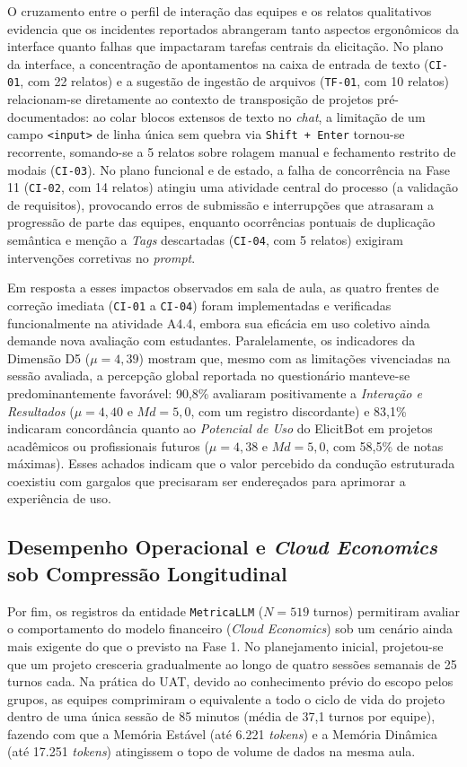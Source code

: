 O cruzamento entre o perfil de interação das equipes e os relatos qualitativos evidencia que os incidentes reportados abrangeram tanto aspectos ergonômicos da interface quanto falhas que impactaram tarefas centrais da elicitação. No plano da interface, a concentração de apontamentos na caixa de entrada de texto (\texttt{CI-01}, com 22 relatos) e a sugestão de ingestão de arquivos (\texttt{TF-01}, com 10 relatos) relacionam-se diretamente ao contexto de transposição de projetos pré-documentados: ao colar blocos extensos de texto no \textit{chat}, a limitação de um campo \texttt{<input>} de linha única sem quebra via \texttt{Shift + Enter} tornou-se recorrente, somando-se a 5 relatos sobre rolagem manual e fechamento restrito de modais (\texttt{CI-03}). No plano funcional e de estado, a falha de concorrência na Fase 11 (\texttt{CI-02}, com 14 relatos) atingiu uma atividade central do processo (a validação de requisitos), provocando erros de submissão e interrupções que atrasaram a progressão de parte das equipes, enquanto ocorrências pontuais de duplicação semântica e menção a \textit{Tags} descartadas (\texttt{CI-04}, com 5 relatos) exigiram intervenções corretivas no \textit{prompt}.

Em resposta a esses impactos observados em sala de aula, as quatro frentes de correção imediata (\texttt{CI-01} a \texttt{CI-04}) foram implementadas e verificadas funcionalmente na atividade A4.4, embora sua eficácia em uso coletivo ainda demande nova avaliação com estudantes. Paralelamente, os indicadores da Dimensão D5 ($\mu = 4,39$) mostram que, mesmo com as limitações vivenciadas na sessão avaliada, a percepção global reportada no questionário manteve-se predominantemente favorável: 90,8\% avaliaram positivamente a \textit{Interação e Resultados} ($\mu = 4,40$ e $Md = 5,0$, com um registro discordante) e 83,1\% indicaram concordância quanto ao \textit{Potencial de Uso} do ElicitBot em projetos acadêmicos ou profissionais futuros ($\mu = 4,38$ e $Md = 5,0$, com 58,5\% de notas máximas). Esses achados indicam que o valor percebido da condução estruturada coexistiu com gargalos que precisaram ser endereçados para aprimorar a experiência de uso.

\subsection{Desempenho Operacional e \textit{Cloud Economics} sob Compressão Longitudinal}

Por fim, os registros da entidade \texttt{MetricaLLM} ($N = 519$ turnos) permitiram avaliar o comportamento do modelo financeiro (\textit{Cloud Economics}) sob um cenário ainda mais exigente do que o previsto na Fase 1. No planejamento inicial, projetou-se que um projeto cresceria gradualmente ao longo de quatro sessões semanais de 25 turnos cada. Na prática do UAT, devido ao conhecimento prévio do escopo pelos grupos, as equipes comprimiram o equivalente a todo o ciclo de vida do projeto dentro de uma única sessão de 85 minutos (média de 37,1 turnos por equipe), fazendo com que a Memória Estável (até 6.221 \textit{tokens}) e a Memória Dinâmica (até 17.251 \textit{tokens}) atingissem o topo de volume de dados na mesma aula.


